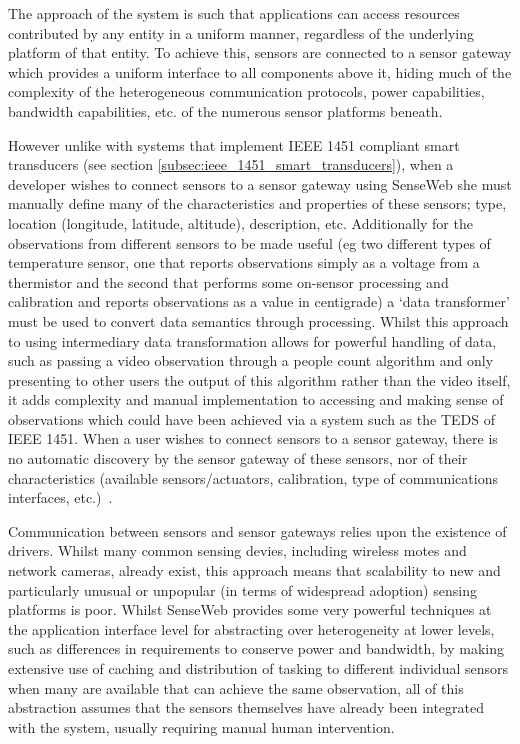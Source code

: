 The approach of the system is such that applications can access resources contributed by any entity in a uniform manner, regardless of the underlying platform of that entity. To achieve this, sensors are connected to a sensor gateway which provides a uniform interface to all components above it, hiding much of the complexity of the heterogeneous communication protocols, power capabilities, bandwidth capabilities, etc. of the numerous sensor platforms beneath.

However unlike with systems that implement IEEE 1451 compliant smart transducers (see section \ref{subsec:ieee_1451_smart_transducers}), when a developer wishes to connect sensors to a sensor gateway using SenseWeb she must manually define many of the characteristics and properties of these sensors; type, location (longitude, latitude, altitude), description, etc. Additionally for the observations from different sensors to be made useful (eg two different types of temperature sensor, one that reports observations simply as a voltage from a thermistor and the second that performs some on-sensor processing and calibration and reports observations as a value in centigrade) a `data transformer' must be used to convert data semantics through processing. Whilst this approach to using intermediary data transformation allows for powerful handling of data, such as passing a video observation through a people count algorithm and only presenting to other users the output of this algorithm rather than the video itself, it adds complexity and manual implementation to accessing and making sense of observations which could have been achieved via a system such as the TEDS of IEEE 1451. When a user wishes to connect sensors to a sensor gateway, there is no automatic discovery by the sensor gateway of these sensors, nor of their characteristics (available sensors/actuators, calibration, type of communications interfaces, etc.)~\cite{MicrosoftResearch2008}.

Communication between sensors and sensor gateways relies upon the existence of drivers. Whilst many common sensing devies, including wireless motes and network cameras, already exist, this approach means that scalability to new and particularly unusual or unpopular (in terms of widespread adoption) sensing platforms is poor. Whilst SenseWeb provides some very powerful techniques at the application interface level for abstracting over heterogeneity at lower levels, such as differences in requirements to conserve power and bandwidth, by making extensive use of caching and distribution of tasking to different individual sensors when many are available that can achieve the same observation, all of this abstraction assumes that the sensors themselves have already been integrated with the system, usually requiring manual human intervention.

